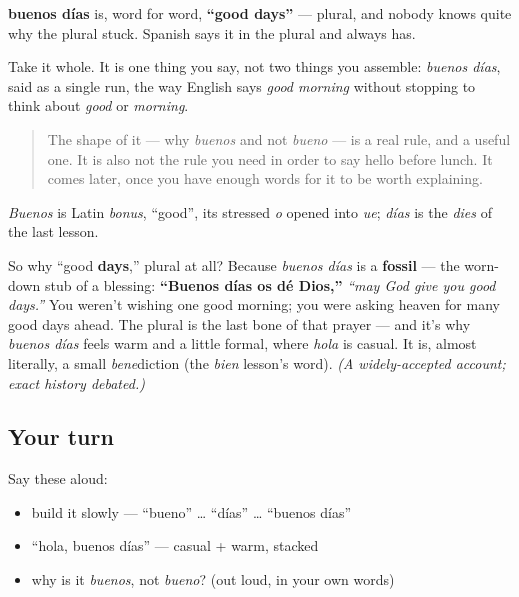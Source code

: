 \begin{cousinweb}
\textbf{buenos días} is, word for word, \textbf{\textquotedblleft{}good days\textquotedblright{}} — plural, and nobody knows quite why the plural stuck. Spanish says it in the plural and always has.

Take it whole. It is one thing you say, not two things you assemble: \emph{buenos días}, said as a single run, the way English says \emph{good morning} without stopping to think about \emph{good} or \emph{morning}.

\begin{quote}
The shape of it — why \emph{buenos} and not \emph{bueno} — is a real rule, and a useful one. It is also not the rule you need in order to say hello before lunch. It comes later, once you have enough words for it to be worth explaining.
\end{quote}

\emph{Buenos} is Latin \emph{bonus}, \textquotedblleft{}good\textquotedblright{}, its stressed \emph{o} opened into \emph{ue}; \emph{días} is the \emph{dies} of the last lesson.
\end{cousinweb}

\begin{culture}
So why \textquotedblleft{}good \textbf{days},\textquotedblright{} plural at all? Because \emph{buenos días} is a \textbf{fossil} — the worn-down stub of a blessing: \textbf{\textquotedblleft{}Buenos días os dé Dios,\textquotedblright{}} \emph{\textquotedblleft{}may God give you good days.\textquotedblright{}} You weren't wishing one good morning; you were asking heaven for many good days ahead. The plural is the last bone of that prayer — and it's why \emph{buenos días} feels warm and a little formal, where \emph{hola} is casual. It is, almost literally, a small \emph{bene}diction (the \emph{bien} lesson's word). \emph{(A widely-accepted account; exact history debated.)}
\end{culture}

\subsection*{Your turn}
Say these aloud:

\begin{itemize}
\raggedright
  \item build it slowly — \textquotedblleft{}bueno\textquotedblright{} … \textquotedblleft{}días\textquotedblright{} … \textquotedblleft{}buenos días\textquotedblright{}
  \item \textquotedblleft{}hola, buenos días\textquotedblright{} — casual + warm, stacked
  \item why is it \emph{buenos}, not \emph{bueno}? (out loud, in your own words)
\end{itemize}

